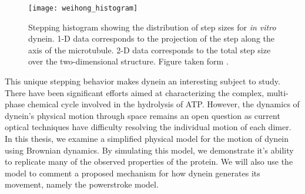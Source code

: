 \begin{figure}[!hbt]
	\centering
	\texttt{[image: weihong\_histogram]}
	\caption{Stepping histogram showing the distribution of step sizes for \textit{in vitro} dynein. 1-D data corresponds to the projection of the step along the axis of the microtubule. 2-D data corresponds to the total step size over the two-dimensional structure. Figure taken form \cite{qiu_dynein_2012}.}  
	\label{fig:weihong histogram} 
\end{figure}

This unique stepping behavior makes dynein an interesting subject to study. There have been significant efforts aimed at characterizing the complex, multi-phase chemical cycle involved in the hydrolysis of ATP\cite{cianfrocco_mechanism_2015}. However, the dynamics of dynein's physical motion through space remains an open question as current optical techniques have difficulty resolving the individual motion of each dimer. In this thesis, we examine a simplified physical model for the motion of dynein using Brownian dynamics. By simulating this model, we demonstrate it's ability to replicate many of the observed properties of the protein. We will also use the model to comment a proposed mechanism for how dynein generates its movement, namely the powerstroke model. 

